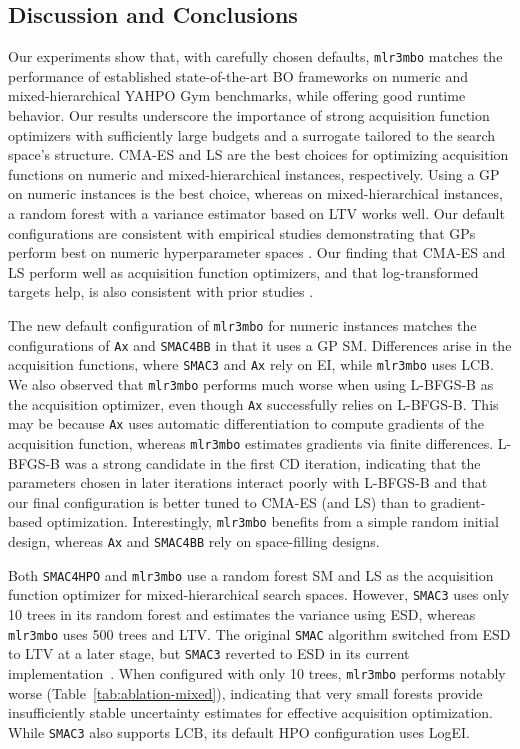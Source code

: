 \documentclass[12pt,letterpaper]{article}
\begin{document}
\subsection*{Discussion and Conclusions}
\label{sec:discussion}

Our experiments show that, with carefully chosen defaults, \texttt{mlr3mbo} matches the performance of established state-of-the-art BO frameworks on numeric and mixed-hierarchical YAHPO Gym benchmarks, 
while offering good runtime behavior.
Our results underscore the importance of strong acquisition function optimizers with sufficiently large budgets and a surrogate tailored to the search space's structure.
CMA-ES and LS are the best choices for optimizing acquisition functions on numeric and mixed-hierarchical instances, respectively.
Using a GP on numeric instances is the best choice, whereas on mixed-hierarchical instances, a random forest with a variance estimator based on LTV works well.
Our default configurations are consistent with empirical studies demonstrating that GPs perform best on numeric hyperparameter spaces \cite{eggensperger2015}.
Our finding that CMA-ES and LS perform well as acquisition function optimizers, and that log-transformed targets help, is also consistent with prior studies \cite{bergstra2011, wang2013, hutter2011, lindauer2019}.

The new default configuration of \texttt{mlr3mbo} for numeric instances matches the configurations of \texttt{Ax} and \texttt{SMAC4BB} in that it uses a GP SM.
Differences arise in the acquisition functions, where \texttt{SMAC3} and \texttt{Ax} rely on EI, while \texttt{mlr3mbo} uses LCB.
We also observed that \texttt{mlr3mbo} performs much worse when using L-BFGS-B as the acquisition optimizer, even though \texttt{Ax} successfully relies on L-BFGS-B.
This may be because \texttt{Ax} uses automatic differentiation to compute gradients of the acquisition function, whereas \texttt{mlr3mbo} estimates gradients via finite differences.
L-BFGS-B was a strong candidate in the first CD iteration, indicating that the parameters chosen in later iterations interact poorly with L-BFGS-B and that our final configuration is better tuned to CMA-ES (and LS) than to gradient-based optimization.
Interestingly, \texttt{mlr3mbo} benefits from a simple random initial design, whereas \texttt{Ax} and \texttt{SMAC4BB} rely on space-filling designs.

Both \texttt{SMAC4HPO} and \texttt{mlr3mbo} use a random forest SM and LS as the acquisition function optimizer for mixed-hierarchical search spaces.
However, \texttt{SMAC3} uses only 10 trees in its random forest and estimates the variance using ESD, whereas \texttt{mlr3mbo} uses 500 trees and LTV.
The original \texttt{SMAC} algorithm switched from ESD to LTV at a later stage, but \texttt{SMAC3} reverted to ESD in its current implementation~\cite{hutter2014, lindauer2022}.
When configured with only 10 trees, \texttt{mlr3mbo} performs notably worse (Table~\ref{tab:ablation-mixed}), indicating that very small forests provide insufficiently stable uncertainty estimates for effective acquisition optimization.
While \texttt{SMAC3} also supports LCB, its default HPO configuration uses LogEI.
\end{document}
